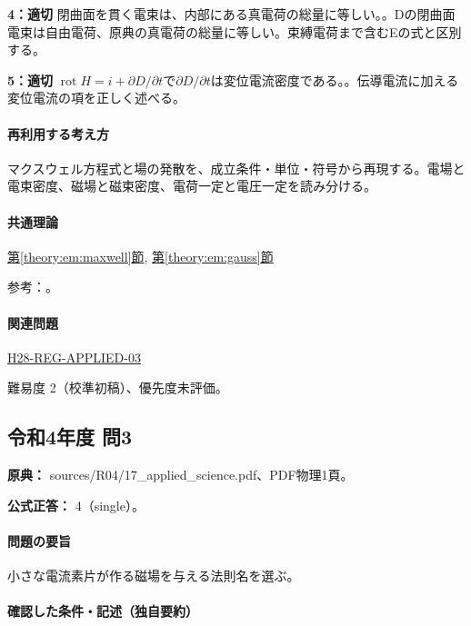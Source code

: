 \noindent\textbf{4：適切} 閉曲面を貫く電束は、内部にある真電荷の総量に等しい。。Dの閉曲面電束は自由電荷、原典の真電荷の総量に等しい。束縛電荷まで含むEの式と区別する。\par

\noindent\textbf{5：適切} \(\operatorname{rot}H=i+\partial D/\partial t\)で\(\partial D/\partial t\)は変位電流密度である。。伝導電流に加える変位電流の項を正しく述べる。\par

\paragraph{再利用する考え方} マクスウェル方程式と場の発散を、成立条件・単位・符号から再現する。電場と電束密度、磁場と磁束密度、電荷一定と電圧一定を読み分ける。

\paragraph{共通理論} \hyperref[theory:em:maxwell]{第\ref*{theory:em:maxwell}節}, \hyperref[theory:em:gauss]{第\ref*{theory:em:gauss}節}

\par 参考：\cite{mit_em13}。

\paragraph{関連問題} \hyperref[q:h28-reg-applied-03]{H28-REG-APPLIED-03}

\par 難易度 2（校準初稿）、優先度未評価。

\subsection{令和4年度 問3}
\label{q:r04-reg-applied-03}

\noindent\textbf{原典：} sources/R04/17\_applied\_science.pdf、PDF物理1頁。

\textbf{公式正答：} 4（single）。

\paragraph{問題の要旨} 小さな電流素片が作る磁場を与える法則名を選ぶ。

\paragraph{確認した条件・記述（独自要約）}\mbox{}\par

